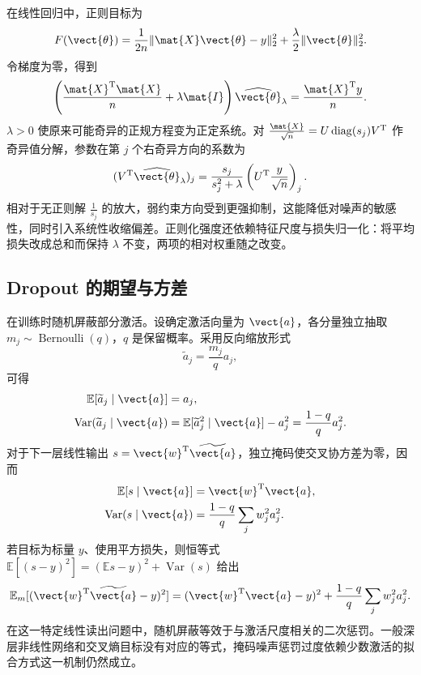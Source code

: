 \documentclass[../textbook.tex]{subfiles}
\begin{document}
在线性回归中，正则目标为
\begin{equation}
 F(\vect{\theta})=\frac1{2n}\|\mat{X}\vect{\theta}-y\|_2^2+\frac\lambda2\|\vect{\theta}\|_2^2.
\end{equation}
令梯度为零，得到
\begin{equation}
 \left(\frac{\mat{X}^{\mathrm{T}}\mat{X}}{n}+\lambda \mat{I}\right)\widehat{\vect{\theta}}_\lambda
 =\frac{\mat{X}^{\mathrm{T}}y}{n}.
\end{equation}
$\lambda>0$ 使原来可能奇异的正规方程变为正定系统。对 $\frac{\mat{X}}{\sqrt n}=U\operatorname{diag}(s_j)V^{\mathrm{T}}$ 作奇异值分解，参数在第 $j$ 个右奇异方向的系数为
\begin{equation}
 (V^{\mathrm{T}}\widehat{\vect{\theta}}_\lambda)_j
 =\frac{s_j}{s_j^2+\lambda}\left(U^{\mathrm{T}}\frac y{\sqrt n}\right)_j.
\end{equation}
相对于无正则解 $\frac{1}{s_j}$ 的放大，弱约束方向受到更强抑制，这能降低对噪声的敏感性，同时引入系统性收缩偏差。正则化强度还依赖特征尺度与损失归一化：将平均损失改成总和而保持 $\lambda$ 不变，两项的相对权重随之改变。

\subsection{Dropout 的期望与方差}
在训练时随机屏蔽部分激活\cite{srivastava2014dropout}。设确定激活向量为 $\vect{a}$，各分量独立抽取 $m_j\sim\operatorname{Bernoulli}(q)$，$q$ 是保留概率。采用反向缩放形式
\begin{equation}
 \widetilde a_j=\frac{m_j}{q}a_j,
\end{equation}
可得
\begin{align}
 \mathbb E[\widetilde a_j\mid \vect{a}]&=a_j,\\
 \operatorname{Var}(\widetilde a_j\mid \vect{a})
 &=\mathbb E[\widetilde a_j^2\mid \vect{a}]-a_j^2
 =\frac{1-q}{q}a_j^2.
\end{align}
对于下一层线性输出 $s=\vect{w}^{\mathrm{T}}\widetilde{\vect{a}}$，独立掩码使交叉协方差为零，因而
\begin{equation}
\begin{aligned}
 \mathbb E[s\mid \vect{a}] &= \vect{w}^{\mathrm{T}}\vect{a}, \\
 \operatorname{Var}(s\mid \vect{a}) &= \frac{1-q}{q}\sum_jw_j^2a_j^2.
\end{aligned}
\end{equation}
若目标为标量 $y$、使用平方损失，则恒等式 $\mathbb E[(s-y)^2]=(\mathbb Es-y)^2+\operatorname{Var}(s)$ 给出
\begin{equation}
 \mathbb E_m[(\vect{w}^{\mathrm{T}}\widetilde{\vect{a}}-y)^2]
 =(\vect{w}^{\mathrm{T}}\vect{a}-y)^2+\frac{1-q}{q}\sum_jw_j^2a_j^2.\label{eq:opt-dropout-reg}
\end{equation}
在这一特定线性读出问题中，随机屏蔽等效于与激活尺度相关的二次惩罚。一般深层非线性网络和交叉熵目标没有对应的等式，掩码噪声惩罚过度依赖少数激活的拟合方式这一机制仍然成立。
\end{document}
